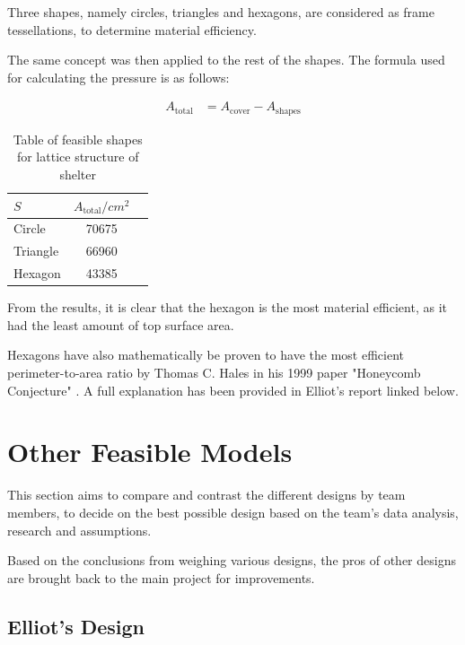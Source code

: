 \documentclass[a4paper,titlepage]{article}
\begin{document}
Three shapes, namely circles, triangles and hexagons, are considered as frame tessellations, to determine material efficiency.

The same concept was then applied to the rest of the shapes. The formula used for calculating the pressure is as follows:

\begin{align}
    A_\text{total}&=A_\text{cover}-A_\text{shapes}
\end{align}

\begin{table}[htbp]
    \centering
    \begin{tabular}{l|c p{5cm}}
        $S$ & $A_\text{total}/\si{cm^2}$ \\
        \hline
        Circle & 70675\\
        Triangle & 66960\\
        Hexagon & 43385\\
    \end{tabular}
    \caption{Table of feasible shapes for lattice structure of shelter}
    \label{tab:latticeStructure}
\end{table}

From the results, it is clear that the hexagon is the most material efficient, as it had the least amount of top surface area.

Hexagons have also mathematically be proven to have the most efficient perimeter-to-area ratio by Thomas C. Hales in his 1999 paper "Honeycomb Conjecture" \cite{hales-honeycomb}. A full explanation has been provided in Elliot's report linked below.

\pagebreak
\section{Other Feasible Models}\label{sec:Other Feasible Models}

This section aims to compare and contrast the different designs by team members, to decide on the best possible design based on the team’s data analysis, research and assumptions.

Based on the conclusions from weighing various designs, the pros of other designs are brought back to the main project for improvements.

\subsection{Elliot's Design}\label{sec:Other Feasible Models:Elliot's Design}
\end{document}

